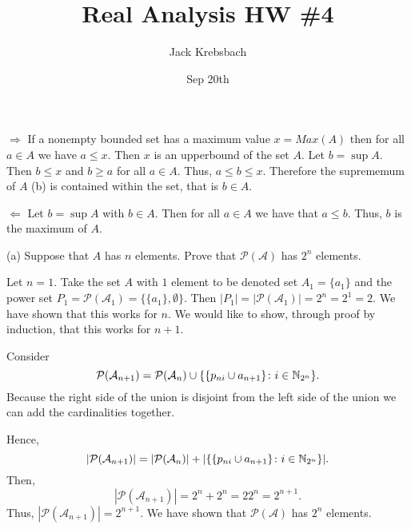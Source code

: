 \documentclass{report}
\title{Real Analysis HW \#4}
\author{Jack Krebsbach }
\date{Sep 20th}
\begin{document}
\maketitle
{}

\sol 

\begin{myproof}
    
\smallskip  
$\Rightarrow$ If a nonempty bounded set has a maximum value $x= Max(A)$ then for all $a \in A$ we have $ a \leq x.$ Then $x$ is an upperbound of the set $A.$ Let $b= \sup A.$ Then $b \leq x$  and $b \geq a$ for all $a \in A$. Thus, $a \leq b \leq x.$ Therefore the suprememum of $A$ (b) is contained within the set, that is $b \in A.$  

$\Leftarrow$
Let $b = \sup A$ with $b \in A.$ Then for all $a \in A$ we have that $a \leq b.$ Thus, $b$ is the maximum of $A.$ 

\end{myproof}


(a) Suppose that $A$ has $n$ elements. Prove that $\mathcal{P}(\mathcal{A})$ has $2^n$ elements.
\bigskip
\par
\sol

Let $n=1.$ Take the set $A$ with $1$ element to be denoted set $A_1=\{ a_1 \}$ and the power set $P_1 = \mathcal{P}(\mathcal{A}_1)= \{\{a_1\}, \emptyset \}.$ Then $|P_1| = |\mathcal{P}(\mathcal{A}_1)|= 2^n  = 2^1 = 2.$  We have shown that this works for $n.$ We would like to show, through proof by induction, that this works for $n+1.$ \par
Consider $$\mathcal{P}(\mathcal{A}_{n+1}) = \mathcal{P}(\mathcal{A}_{n}) \cup  \{ \{p_{ni}\cup {a_{n+1}}\} \colon i  \in \NN_{2^n}\}.$$ Because the right side of the union is disjoint from the left side of the union we can add the cardinalities together.

Hence, $$ |\mathcal{P}(\mathcal{A}_{n+1})| = |\mathcal{P}(\mathcal{A}_{n})| + |\{ \{p_{ni}\cup {a_{n+1}}\} \colon i  \in \NN_{2^n}\}|.$$
Then,
$$ |\mathcal{P}(\mathcal{A}_{n+1})| = 2^n +2^n= 22^n = 2^{n+1}.$$ Thus, $|\mathcal{P}(\mathcal{A}_{n+1})| = 2^{n+1}.$ We have shown that $\mathcal{P}(\mathcal{A})$ has $2^n$ elements.
\end{document}
